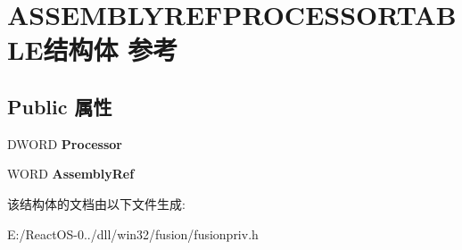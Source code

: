 \hypertarget{struct_a_s_s_e_m_b_l_y_r_e_f_p_r_o_c_e_s_s_o_r_t_a_b_l_e}{}\section{A\+S\+S\+E\+M\+B\+L\+Y\+R\+E\+F\+P\+R\+O\+C\+E\+S\+S\+O\+R\+T\+A\+B\+L\+E结构体 参考}
\label{struct_a_s_s_e_m_b_l_y_r_e_f_p_r_o_c_e_s_s_o_r_t_a_b_l_e}
\subsection*{Public 属性}
\begin{DoxyCompactItemize}
\item 
\mbox{\label{struct_a_s_s_e_m_b_l_y_r_e_f_p_r_o_c_e_s_s_o_r_t_a_b_l_e_a7dbf5bee35baed7057343decbc945151}} 
D\+W\+O\+RD {\bfseries Processor}
\item 
\mbox{\label{struct_a_s_s_e_m_b_l_y_r_e_f_p_r_o_c_e_s_s_o_r_t_a_b_l_e_a353c52cbe56b7267999bb1598f15f79e}} 
W\+O\+RD {\bfseries Assembly\+Ref}
\end{DoxyCompactItemize}


该结构体的文档由以下文件生成\+:\begin{DoxyCompactItemize}
\item 
E\+:/\+React\+O\+S-\/0../dll/win32/fusion/fusionpriv.\+h\end{DoxyCompactItemize}
